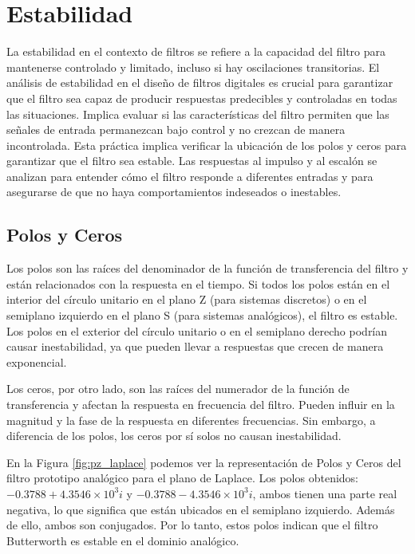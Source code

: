\section{Estabilidad}
La estabilidad en el contexto de filtros se refiere a la capacidad del filtro para mantenerse controlado y limitado, incluso si hay oscilaciones transitorias. El análisis de estabilidad en el diseño de filtros digitales es crucial para garantizar que el filtro sea capaz de producir respuestas predecibles y controladas en todas las situaciones. Implica evaluar si las características del filtro permiten que las señales de entrada permanezcan bajo control y no crezcan de manera incontrolada.
Esta práctica implica verificar la ubicación de los polos y ceros para garantizar que el filtro sea estable. Las respuestas al impulso y al escalón se analizan para entender cómo el filtro responde a diferentes entradas y para asegurarse de que no haya comportamientos indeseados o inestables.

\subsection*{Polos y Ceros}
Los polos son las raíces del denominador de la función de transferencia del filtro y están relacionados con la respuesta en el tiempo. Si todos los polos están en el interior del círculo unitario en el plano Z (para sistemas discretos) o en el semiplano izquierdo en el plano S (para sistemas analógicos), el filtro es estable. Los polos en el exterior del círculo unitario o en el semiplano derecho podrían causar inestabilidad, ya que pueden llevar a respuestas que crecen de manera exponencial.

Los ceros, por otro lado, son las raíces del numerador de la función de transferencia y afectan la respuesta en frecuencia del filtro. Pueden influir en la magnitud y la fase de la respuesta en diferentes frecuencias. Sin embargo, a diferencia de los polos, los ceros por sí solos no causan inestabilidad.

En la Figura \ref{fig:pz_laplace} podemos ver la representación de Polos y Ceros del filtro prototipo analógico para el plano de Laplace. Los polos obtenidos: $-0.3788 + 4.3546\times10^3i$ y $-0.3788 - 4.3546\times10^3i$, ambos tienen una parte real negativa, lo que significa que están ubicados en el semiplano izquierdo. Además de ello, ambos son conjugados. Por lo tanto, estos polos indican que el filtro Butterworth es estable en el dominio analógico.

